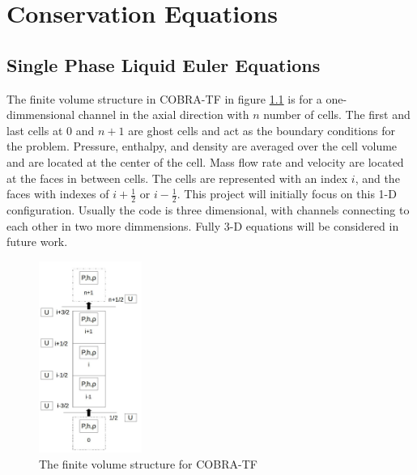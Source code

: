 \vspace*{-80mm}
\chapter{Conservation Equations} \label{chapter2:conservation_equations}
	
	
\section{Single Phase Liquid Euler Equations} \label{sec:euler_equations}
	
	The finite volume structure in COBRA-TF in figure \ref{fig:CTF-Cells} is for
	a one-dimmensional channel in the axial direction with $n$ number of cells.
	The first and last cells at $0$ and $n+1$ are ghost cells and act as the
	boundary conditions for the problem. Pressure, enthalpy, and density are
	averaged over the cell volume and are located at the center of the cell.
	Mass flow rate and velocity are located at the faces in between cells. The
	cells are represented with an index $i$, and the faces with indexes of
	$i+\frac{1}{2}$ or $i-\frac{1}{2}$. This project will initially focus
	on this 1-D configuration. Usually the code is three dimensional, with
	channels connecting to each other in two more dimmensions. Fully 3-D
	equations will be considered in future work.
	
	\begin{figure}[!h]
		\centering
		\includegraphics[width=0.30\textwidth]{images/CTF-Cells}
		\caption{The finite volume structure for COBRA-TF}
		\label{fig:CTF-Cells}
	\end{figure}


